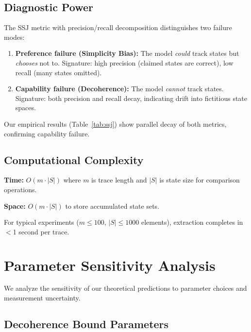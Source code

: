 \documentclass{article}
\theoremstyle{plain}
\theoremstyle{definition}
\theoremstyle{remark}
\begin{document}
\subsection{Diagnostic Power}

The SSJ metric with precision/recall decomposition distinguishes two failure modes:

\begin{enumerate}
\item \textbf{Preference failure (Simplicity Bias):} The model \emph{could} track states but \emph{chooses} not to. Signature: high precision (claimed states are correct), low recall (many states omitted).

\item \textbf{Capability failure (Decoherence):} The model \emph{cannot} track states. Signature: both precision and recall decay, indicating drift into fictitious state spaces.
\end{enumerate}

Our empirical results (Table~\ref{tab:ssj}) show parallel decay of both metrics, confirming capability failure.

\subsection{Computational Complexity}

\textbf{Time:} $O(m \cdot |S|)$ where $m$ is trace length and $|S|$ is state size for comparison operations.

\textbf{Space:} $O(m \cdot |S|)$ to store accumulated state sets.

For typical experiments ($m \leq 100$, $|S| \leq 1000$ elements), extraction completes in $<$1 second per trace.


\section{Parameter Sensitivity Analysis}
\label{app:sensitivity_ext}

We analyze the sensitivity of our theoretical predictions to parameter choices and measurement uncertainty.

\subsection{Decoherence Bound Parameters}
\end{document}
